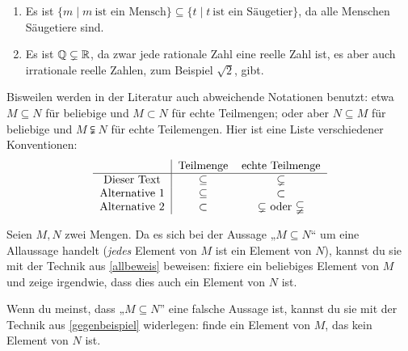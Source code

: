 \begin{bsp} \quad
    \begin{enumerate}
        \item Es ist $\{m\mid m\ \text{ist ein Mensch}\}\subseteq \{t\mid t\ \text{ist ein Säugetier}\}$, da alle Menschen Säugetiere sind.
        \item Es ist $\mathbb Q\subsetneq \mathbb R$, da zwar jede rationale Zahl eine reelle Zahl ist, es aber auch irrationale reelle Zahlen, zum Beispiel $\sqrt{2}$, gibt.
    \end{enumerate}
\end{bsp}


\begin{nota}
    Bisweilen werden in der Literatur auch abweichende Notationen benutzt: etwa $M\subseteq N$ für beliebige und $M\subset N$ für echte Teilmengen; oder aber $N\subseteq M$ für beliebige und $M\subsetneqq N$ für echte Teilemengen. Hier ist eine Liste verschiedener Konventionen:
    \[\begin{tabular}{c|ccc}
        & Teilmenge & echte Teilmenge \\ \hline
        Dieser Text & $\subseteq$ & $\subsetneq$ \\
        Alternative 1 & $\subseteq$ & $\subset$ \\
        Alternative 2 & $\subset$ & $\subsetneq$ oder $\subsetneqq$
    \end{tabular}\]
\end{nota}


\begin{bem} \label{teilmengebeweisen}
    Seien $M,N$ zwei Mengen. Da es sich bei der Aussage „$M\subseteq N$“ um eine Allaussage handelt (\emph{jedes} Element von $M$ ist ein Element von $N$), kannst du sie mit der Technik aus \cref{allbeweis} beweisen: fixiere ein beliebiges Element von $M$ und zeige irgendwie, dass dies auch ein Element von $N$ ist.
    
    Wenn du meinst, dass „$M\subseteq N$” eine falsche Aussage ist, kannst du sie mit der Technik aus \cref{gegenbeispiel} widerlegen: finde ein Element von $M$, das kein Element von $N$ ist.
\end{bem}


